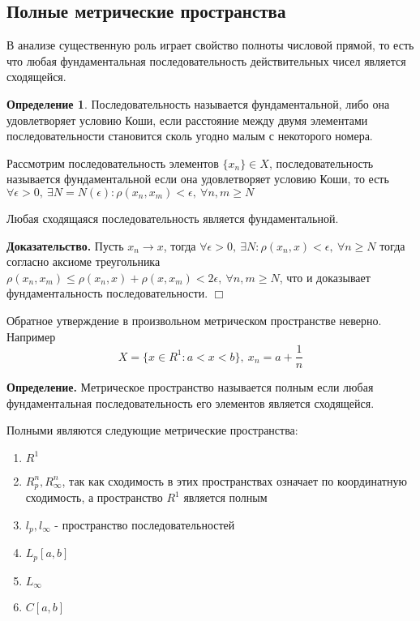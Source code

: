 \documentclass[14pt,a4paper]{extarticle}
\theoremstyle{definition}
\newtheorem{definition}{Определение}[section]
\theoremstyle{remark}
\renewcommand{\[}{\begin{dmath*}[compact]}
\renewcommand{\]}{\end{dmath*}}
\newcommand{\sep}{ , \ \allowbreak }
\newcommand\f[2]{\dfrac{#1}{#2}}
\newcommand{\tdef}{\textbf{Определение.} }
\newcommand{\btev}[1][]{\textbf{Доказательство#1.}
}
\newcommand{\etev}{$\Box$}
\begin{document}
\subsection{Полные метрические пространства}

В анализе существенную роль играет свойство полноты числовой прямой, то есть
что любая фундаментальная последовательность действительных чисел является
сходящейся.

\begin{definition}
  Последовательность называется фундаментальной, либо она удовлетворяет условию Коши,
  если расстояние между двумя элементами последовательности становится сколь
  угодно малым с некоторого номера.
\end{definition}

Рассмотрим последовательность элементов $\{x_n\} \in X$, последовательность
называется фундаментальной если она удовлетворяет условию Коши, то есть
$ \forall \epsilon > 0 \sep \exists N = N(\epsilon): \rho(x_n, x_m) < \epsilon
\sep \forall n, m \geq N $

Любая сходящаяся последовательность является фундаментальной.

\btev[] Пусть $x_n \to x$, тогда
$\forall \epsilon > 0 \sep \exists N: \rho(x_n, x) < \epsilon \sep
\forall n \geq N$
тогда согласно аксиоме треугольника
$\rho(x_n, x_m) \leq \rho(x_n, x)+\rho(x, x_m) < 2\epsilon \sep
\forall n, m \geq N$,
что и доказывает фундаментальность последовательности. \etev

Обратное утверждение в произвольном метрическом пространстве неверно.
Например \[ {X = \{x \in R^1: a < x < b\}} \sep {x_n = a + \f{1}{n}}\]

\tdef Метрическое пространство называется полным если любая
фундаментальная последовательность его элементов является сходящейся.

Полными являются следующие метрические пространства:

\begin{enumerate}
  \item $R^1$
  \item $R_p^n, R_\infty^n$, так как сходимость в этих пространствах означает
  по координатную сходимость, а пространство $R^1$ является полным
  \item $l_p, l_\infty$ - пространство последовательностей
  \item $L_p[a,b]$
  \item $L_\infty$
  \item $C[a,b]$
\end{enumerate}
\end{document}
